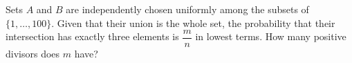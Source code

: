 Sets $A$ and $B$ are independently chosen uniformly among the subsets of $\{1,\ldots,100\}$. Given that their union is the whole set, the probability that their intersection has exactly three elements is $\dfrac{m}{n}$ in lowest terms. How many positive divisors does $m$ have?
